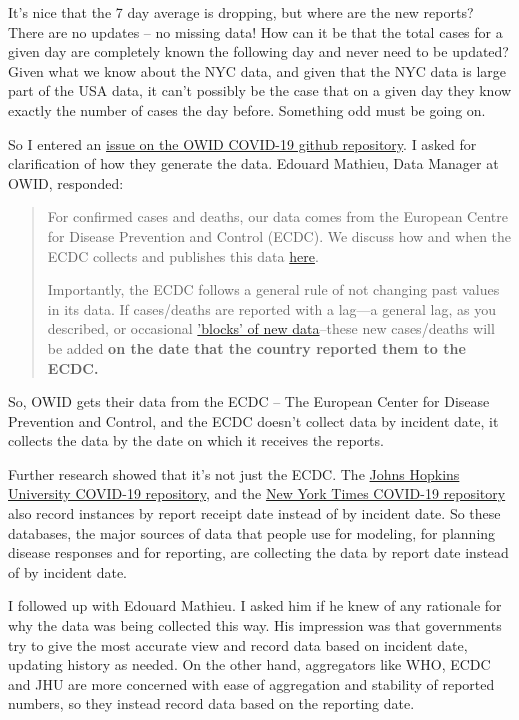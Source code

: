 \documentclass[10pt,reqno]{amsart}
\begin{document}
It's nice that the 7 day average is dropping, but where are the new
reports?  There are no updates -- no missing data!  How can it be
that the total cases for a given day are completely known the
following day and never need to be updated?
Given what we know about the NYC data, and given
that the NYC data is large part of the USA data, it can't possibly be
the case that on a given day they know exactly the number of cases the
day before.  Something odd must be going on.

So I entered an
\href{https://github.com/owid/covid-19-data/issues/41}{issue on the
  OWID COVID-19 github repository}.  I asked for clarification of how they generate the
data.  Edouard Mathieu, Data Manager at OWID, responded:
\begin{quotation}
  For confirmed cases and deaths, our data comes from the European
  Centre for Disease Prevention and Control (ECDC). We discuss how and
  when the ECDC collects and publishes this data \href{https://ourworldindata.org/coronavirus#our-world-in-data-relies-on-data-from-the-european-cdc}{here}.

  Importantly, the ECDC follows a general rule of not changing past
  values in its data. If cases/deaths are reported with a lag—a general
  lag, as you described, or occasional
  \href{https://www.theguardian.com/us-news/2020/apr/15/new-york-city-coronavirus-death-toll-jumps-revised-count}{'blocks'
    of new data}--these new
  cases/deaths will be added \bf{on the date that the country reported them
    to the ECDC.}
\end{quotation}

So, OWID gets their data from the ECDC -- The European Center for
Disease Prevention and Control, and the ECDC doesn't collect data by
incident date, it collects the data by the date on which it receives
the reports.

Further research showed that it's not just the ECDC.  The
\href{https://github.com/CSSEGISandData/COVID-19}{Johns Hopkins
  University COVID-19 repository}, and the
\href{https://github.com/nytimes/covid-19-data}{New York Times
  COVID-19 repository} also record instances by report receipt date
instead of by incident date.  So these databases, the major sources of
data that people use for modeling, for planning disease responses and
for reporting, are collecting the data by report date instead of by
incident date.\nocite{JHU2020data,NYT2020data}

I followed up with Edouard Mathieu.  I asked him if he knew of any
rationale for why the data was being collected this way.  His
impression was that governments try to give the most accurate view and
record data based on incident date, updating history as needed.  On
the other hand, aggregators like WHO, ECDC and JHU are more concerned
with ease of aggregation and stability of reported numbers, so they
instead record data based on the reporting date.\cite{Mathieu2020Dates}
\end{document}
